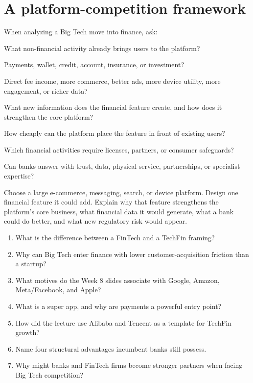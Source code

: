 \section{A platform-competition framework}

When analyzing a Big Tech move into finance, ask:

\begin{utpsteps}
  \item {} What non-financial activity already brings users to the platform?
  \item {} Payments, wallet, credit, account, insurance, or investment?
  \item {} Direct fee income, more commerce, better ads, more device utility, more engagement, or richer data?
  \item {} What new information does the financial feature create, and how does it strengthen the core platform?
  \item {} How cheaply can the platform place the feature in front of existing users?
  \item {} Which financial activities require licenses, partners, or consumer safeguards?
  \item {} Can banks answer with trust, data, physical service, partnerships, or specialist expertise?
\end{utpsteps}

\begin{tryit}
Choose a large e-commerce, messaging, search, or device platform. Design one financial feature it could add. Explain why that feature strengthens the platform's core business, what financial data it would generate, what a bank could do better, and what new regulatory risk would appear.
\end{tryit}

\begin{quickcheck}
\begin{enumerate}
  \item What is the difference between a FinTech and a TechFin framing?
  \item Why can Big Tech enter finance with lower customer-acquisition friction than a startup?
  \item What motives do the Week 8 slides associate with Google, Amazon, Meta/Facebook, and Apple?
  \item What is a super app, and why are payments a powerful entry point?
  \item How did the lecture use Alibaba and Tencent as a template for TechFin growth?
  \item Name four structural advantages incumbent banks still possess.
  \item Why might banks and FinTech firms become stronger partners when facing Big Tech competition?
\end{enumerate}
\end{quickcheck}
